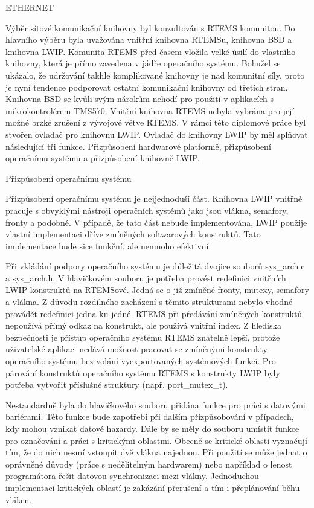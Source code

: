 \sec ETHERNET

	Výběr sítové komunikační knihovny byl konzultován s RTEMS komunitou.
Do hlavního výběru byla uvažována vnitřní knihovna RTEMSu, knihovna BSD a knihovna LWIP.
Komunita RTEMS před časem vložila velké úsilí do vlastního knihovny, která je přímo zavedena v jádře operačního systému.
Bohužel se ukázalo, že udržování takhle komplikované knihovny je nad komunitní síly, proto je nyní tendence podporovat ostatní komunikační knihovny od třetích stran.
Knihovna BSD se kvůli svým nárokům nehodí pro použití v aplikacích s mikrokontrolérem TMS570.
Vnitřní knihovna RTEMS nebyla vybrána pro její možné brzké zrušení z vývojové větve RTEMS.
V rámci této diplomové práce byl stvořen ovladač pro knihovnu LWIP.
Ovladač do knihovny LWIP by měl splňovat následující tři funkce.
Přizpůsobení hardwarové platformě, přizpůsobení operačnímu systému a přizpůsobení knihovně LWIP. 

\secc Přizpůsobení operačnímu systému

Přizpůsobení operačnímu systému je nejjednoduší část.
Knihovna LWIP vnitřně pracuje s obvyklými nástroji operačních systémů jako jsou vlákna, semafory, fronty a podobné.
V případě, že tato část nebude implementována, LWIP použije vlastní implementaci dříve zmíněných softwarových konstruktů.
Tato implementace bude sice funkční, ale nemnoho efektivní.

Při vkládání podpory operačního systému je důležitá dvojice souborů sys\_arch.c a sys\_arch.h.
V hlavičkovém souboru je potřeba provést redefinici vnitřních LWIP konstruktů na RTEMSové.
Jedná se o již zmíněné fronty, mutexy, semafory a vlákna.
Z důvodu rozdílného zacházení s těmito strukturami nebylo vhodné provádět redefinici jedna ku jedné.
RTEMS při předávání zmíněných konstruktů nepoužívá přímý odkaz na konstrukt, ale používá vnitřní index.
Z hlediska bezpečnosti je přístup operačního systému RTEMS znatelně lepší, protože uživatelské aplikaci nedává možnost pracovat se zmíněnými konstrukty operačního systému bez volání vyexportovaných systémových funkcí.
Pro párování konstruktů operačního systému RTEMS s konstrukty LWIP byly potřeba vytvořit příslušné struktury (např. port\_mutex\_t).

Nestandardně byla do hlavičkového souboru přidána funkce pro práci s datovými bariérami.
Této funkce bude zapotřebí při dalším přizpůsobování v případech, kdy mohou vznikat datové hazardy.
Dále by se měly do souboru umístit funkce pro označování a práci s kritickými oblastmi.
Obecně se kritické oblasti vyznačují tím, že do nich nesmí vstoupit dvě vlákna najednou.
Při použití se může jednat o oprávněné důvody (práce s nedělitelným hardwarem) nebo například o lenost programátora řešit datovou synchronizaci mezi vlákny.
Jednoduchou implementací kritických oblastí je zakázání přerušení a tím i přeplánování běhu vláken.

